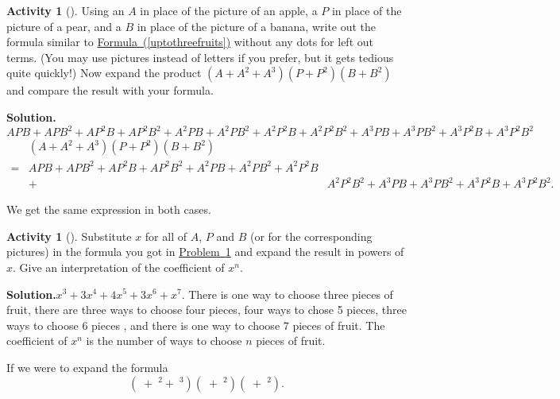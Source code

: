 \documentclass[10pt,]{book}
\theoremstyle{plain}
\theoremstyle{definition}
\newtheorem{activity}[project]{Activity}
\numberwithin{equation}{chapter}
\newcommand{\apple}{\text{🍎}}
\newcommand{\ap}{\apple}
\newcommand{\banana}{\text{🍌}}
\newcommand{\ba}{\banana}
\newcommand{\pear}{\text{🍐}}
\newcommand{\pe}{\pear}
\newcommand{\amp}{&}
\begin{document}
\begin{activity}[]\label{twopiecesoffruit}
Using an \(A\) in place of the picture of an apple, a \(P\) in place of the picture of a pear, and a \(B\) in place of the picture of a banana, write out the formula similar to \hyperref[uptothreefruits]{Formula~(\ref{uptothreefruits})} without any dots for left out terms. (You may use pictures instead of letters if you prefer, but it gets tedious quite quickly!) Now expand the product \((A+A^2+A^3)(P+P^2)(B+B^2)\) and compare the result with your formula.%
\par\medskip\noindent%
\textbf{Solution.}\quad \(APB+APB^2 +AP^2B+ AP^2B^2+ A^2PB+A^2PB^2+ A^2P^2B+ A^2P^2B^2+
A^3PB+A^3PB^2 +A^3P^2B+ A^3P^2B^2\)%
\begin{align*}
\amp (A+A^2+A^3)(P+P^2)(B+B^2)\\
=\amp APB+APB^2+AP^2B+AP^2B^2+A^2PB+A^2PB^2+A^2P^2B\\
\amp +\amp A^2P^2B^2+
A^3PB+A^3PB^2+A^3P^2B+A^3P^2B^2.
\end{align*}
%
\par
We get the same expression in both cases.%
\end{activity}
\begin{activity}[]\label{activity-167}
Substitute \(x\) for all of \(A\), \(P\) and \(B\) (or for the corresponding pictures) in the formula you got in \hyperref[twopiecesoffruit]{Problem~\ref{twopiecesoffruit}} and expand the result in powers of \(x\). Give an interpretation of the coefficient of \(x^n\).%
\par\medskip\noindent%
\textbf{Solution.}\quad \(x^3+3x^4+4x^5+3x^6+x^7\). There is one way to choose three pieces of fruit, there are three ways to choose four pieces, four ways to chose 5 pieces, three ways to choose 6 pieces , and there is one way to choose 7 pieces of fruit. The coefficient of \(x^n\) is the number of ways to choose \(n\) pieces of fruit.%
\end{activity}
If we were to expand the formula%
\begin{equation}
(\ap+\ap^2+\ap^3)(\pe+\pe^2)(\ba+\ba^2).\label{threefruitsagain}
\end{equation}
\end{document}
